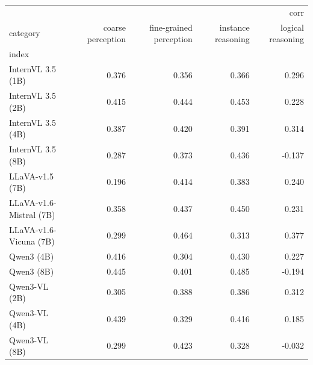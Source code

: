 \begin{tabular}{lrrrr}
\toprule
 & \multicolumn{4}{r}{corr} \\
category & coarse perception & fine-grained perception & instance reasoning & logical reasoning \\
index &  &  &  &  \\
\midrule
InternVL 3.5 (1B) & 0.376 & 0.356 & 0.366 & 0.296 \\
InternVL 3.5 (2B) & 0.415 & 0.444 & 0.453 & 0.228 \\
InternVL 3.5 (4B) & 0.387 & 0.420 & 0.391 & 0.314 \\
InternVL 3.5 (8B) & 0.287 & 0.373 & 0.436 & -0.137 \\
LLaVA-v1.5 (7B) & 0.196 & 0.414 & 0.383 & 0.240 \\
LLaVA-v1.6-Mistral (7B) & 0.358 & 0.437 & 0.450 & 0.231 \\
LLaVA-v1.6-Vicuna (7B) & 0.299 & 0.464 & 0.313 & 0.377 \\
Qwen3 (4B) & 0.416 & 0.304 & 0.430 & 0.227 \\
Qwen3 (8B) & 0.445 & 0.401 & 0.485 & -0.194 \\
Qwen3-VL (2B) & 0.305 & 0.388 & 0.386 & 0.312 \\
Qwen3-VL (4B) & 0.439 & 0.329 & 0.416 & 0.185 \\
Qwen3-VL (8B) & 0.299 & 0.423 & 0.328 & -0.032 \\
\bottomrule
\end{tabular}
